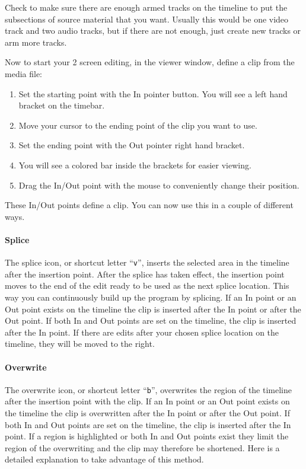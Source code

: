 Check to make sure there are enough armed tracks on the timeline to
put the subsections of source material that you want.  Usually this
would be one video track and two audio tracks, but if there are not
enough, just create new tracks or arm more tracks.

Now to start your 2 screen editing, in the viewer window, define a
clip from the media file:

\begin{enumerate}
\item Set the starting point with the In pointer button.  You
  will see a left hand bracket on the timebar.
\item Move your cursor to the ending point of the clip you want
  to use.
\item Set the ending point with the Out pointer right hand
  bracket.
\item You will see a colored bar inside the brackets for easier
  viewing.
\item Drag the In/Out point with the mouse to conveniently
  change their position.
\end{enumerate}

These In/Out points define a clip.  You can now use this in a couple
of different ways.

\paragraph{Splice} The splice icon, or shortcut letter “\texttt{v}”,
inserts the selected area in the timeline after the insertion point.
After the splice has taken effect, the insertion point moves to the
end of the edit ready to be used as the next splice location. This
way you can continuously build up the program by splicing.  If an In
point or an Out point exists on the timeline the clip is inserted
after the In point or after the Out point. If both In and Out points
are set on the timeline, the clip is inserted after the In point. If
there are edits after your chosen splice location on the timeline,
they will be moved to the right.

\paragraph{Overwrite} The overwrite icon, or shortcut letter
“\texttt{b}”, overwrites the region of the timeline after the
insertion point with the clip. If an In point or an Out point exists
on the timeline the clip is overwritten after the In point or after
the Out point. If both In and Out points are set on the timeline,
the clip is inserted after the In point. If a region is highlighted
or both In and Out points exist they limit the region of the
overwriting and the clip may therefore be shortened. Here is a
detailed explanation to take advantage of this method.

